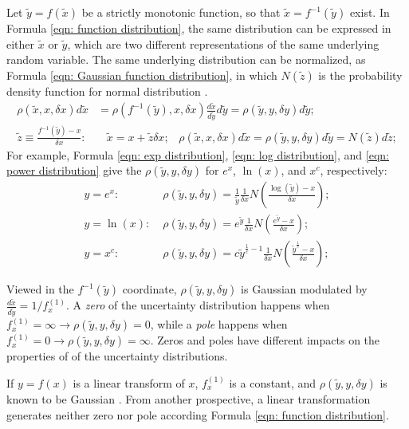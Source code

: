 \documentclass[twoside]{article}
\numberwithin{equation}{section}
\newcommand{\eqspace}{\;\;\;}
\begin{document}
Let $\tilde{y} = f(\tilde{x})$ be a strictly monotonic function, so that $\tilde{x} = f^{-1}(\tilde{y})$ exist.
In Formula \eqref{eqn: function distribution}, the same distribution can be expressed in either $\tilde{x}$ or $\tilde{y}$, which are two different representations of the same underlying random variable.
The same underlying distribution can be normalized, as Formula \eqref{eqn: Gaussian function distribution}, in which $N(\tilde{z})$ is the probability density function for normal distribution \cite{Probability_Statistics}.
\begin{align}
\label{eqn: function distribution}
\rho(\tilde{x}, x, \delta x) d\tilde{x} &= \rho(f^{-1}(\tilde{y}), x, \delta x) \frac{d\tilde{x}}{d\tilde{y}} d\tilde{y} 
= \rho(\tilde{y}, y, \delta y) d\tilde{y}; \\
\label{eqn: Gaussian function distribution}
\tilde{z} \equiv \frac{f^{-1}(\tilde{y}) - x}{\delta x}:&\eqspace 
 \tilde{x} = x + \tilde{z} \delta x; \eqspace 
 \rho(\tilde{x}, x, \delta x) d \tilde{x} = \rho(\tilde{y}, y, \delta y) d \tilde{y} = N(\tilde{z}) d \tilde{z};
\end{align}
For example, Formula \eqref{eqn: exp distribution}, \eqref{eqn: log distribution}, and \eqref{eqn: power distribution} give the $\rho(\tilde{y}, y, \delta y)$ for $e^x$, $\ln(x)$, and $x^c$, respectively:
\begin{align}
\label{eqn: exp distribution}
y = e^x: &\; \rho(\tilde{y}, y, \delta y) = \frac{1}{\tilde{y}} \frac{1}{\delta x} N(\frac{\log(\tilde{y}) - x}{\delta x}); \\
\label{eqn: log distribution}
y = \ln(x): &\; \rho(\tilde{y}, y, \delta y) = e^{\tilde{y}} \frac{1}{\delta x} N(\frac{e^{\tilde{y}} - x}{\delta x}); \\
\label{eqn: power distribution}
y = x^c: &\; \rho(\tilde{y}, y, \delta y) = c \tilde{y}^{\frac{1}{c}-1} \frac{1}{\delta x} N(\frac{\tilde{y}^\frac{1}{c} - x}{\delta x}); 
\end{align}

Viewed in the $f^{-1}(\tilde{y})$ coordinate, $\rho(\tilde{y}, y, \delta y)$ is Gaussian modulated by $\frac{d\tilde{x}}{d\tilde{y}} = 1/f^{(1)}_x$.
A \emph{zero} of the uncertainty distribution happens when $f^{(1)}_x=\infty \rightarrow \rho(\tilde{y}, y, \delta y) = 0$, while a \emph{pole} happens when $f^{(1)}_x=0 \rightarrow \rho(\tilde{y}, y, \delta y) = \infty$.
Zeros and poles have different impacts on the properties of of the uncertainty distributions.

If $y=f(x)$ is a linear transform of $x$, $f^{(1)}_x$ is a constant, and $\rho(\tilde{y}, y, \delta y)$ is known to be Gaussian \cite{Probability_Statistics}.
From another prospective, a linear transformation generates neither zero nor pole according Formula \eqref{eqn: function distribution}.
\end{document}
